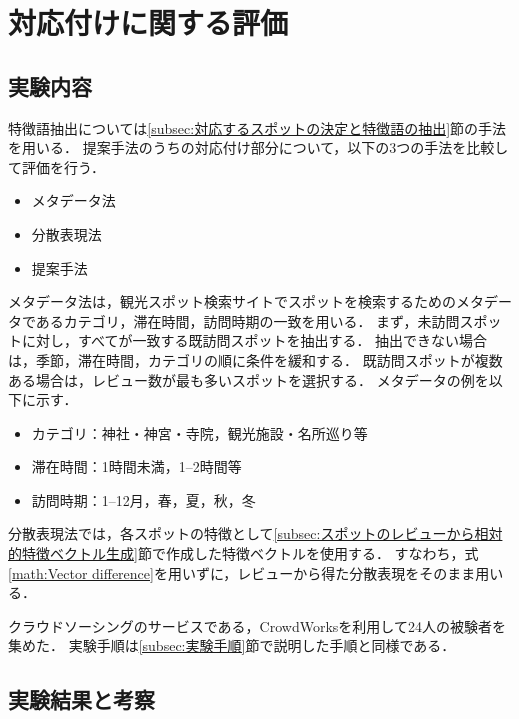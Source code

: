 \documentclass[submit]{ipsj}
\begin{document}
\section{対応付けに関する評価}
\label{sec:対応付けに関する評価}
\subsection{実験内容}
特徴語抽出については\ref{subsec:対応するスポットの決定と特徴語の抽出}節の手法を用いる．
提案手法のうちの対応付け部分について，以下の3つの手法を比較して評価を行う．
\begin{itemize}
  \item メタデータ法
  \item 分散表現法
  \item 提案手法
\end{itemize}

メタデータ法は，観光スポット検索サイトでスポットを検索するためのメタデータであるカテゴリ，滞在時間，訪問時期の一致を用いる．
まず，未訪問スポットに対し，すべてが一致する既訪問スポットを抽出する．
抽出できない場合は，季節，滞在時間，カテゴリの順に条件を緩和する．
既訪問スポットが複数ある場合は，レビュー数が最も多いスポットを選択する．
メタデータの例を以下に示す．
\begin{itemize}
 \item カテゴリ：神社・神宮・寺院，観光施設・名所巡り等
 \item 滞在時間：1時間未満，1--2時間等
 \item 訪問時期：1--12月，春，夏，秋，冬
\end{itemize}

分散表現法では，各スポットの特徴として\ref{subsec:スポットのレビューから相対的特徴ベクトル生成}節で作成した特徴ベクトルを使用する．
すなわち，式\ref{math:Vector difference}を用いずに，レビューから得た分散表現をそのまま用いる．

クラウドソーシングのサービスである，CrowdWorksを利用して24人の被験者を集めた．
実験手順は\ref{subsec:実験手順}節で説明した手順と同様である．

\subsection{実験結果と考察}
\end{document}
